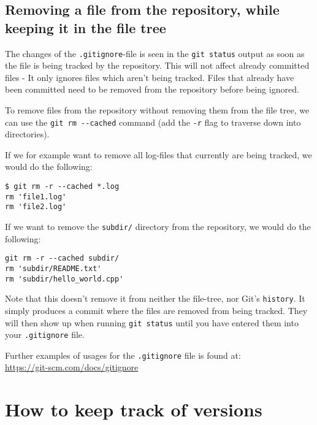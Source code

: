 \documentclass[../main/git_course_main.tex]{subfiles}
\begin{document}
\subsection{Removing a file from the repository, while keeping it in the file tree}

The changes of the \verb$.gitignore$-file is seen in the \verb$git status$
output as soon as the file is being tracked by the repository. This will not affect already committed files - It only ignores files which aren't being tracked. Files that already have been committed need to be removed from the repository before being ignored.

To remove files from the repository without removing them from the file tree, we can use the \verb$git rm --cached$ command (add the \verb$-r$ flag to traverse down into directories).

If we for example want to remove all log-files that currently are being tracked, we would do the following:

\begin{codebox}
\begin{lstlisting}
$ git rm -r --cached *.log
rm 'file1.log'
rm 'file2.log'
\end{lstlisting}
\end{codebox}

If we want to remove the \verb$subdir/$ directory from the repository, we would do the following:

\begin{codebox}
\begin{lstlisting}
git rm -r --cached subdir/
rm 'subdir/README.txt'
rm 'subdir/hello_world.cpp'
\end{lstlisting}
\end{codebox}

Note that this doesn't remove it from neither the file-tree, nor Git's \verb$history$. It simply produces a commit where the files are removed from being tracked. They will then show up when running \verb$git status$ until you have entered them into your \verb$.gitignore$ file.

Further examples of usages for the \verb$.gitignore$ file is found at: \\

\url{https://git-scm.com/docs/gitignore}

\section{How to keep track of versions}
\end{document}
